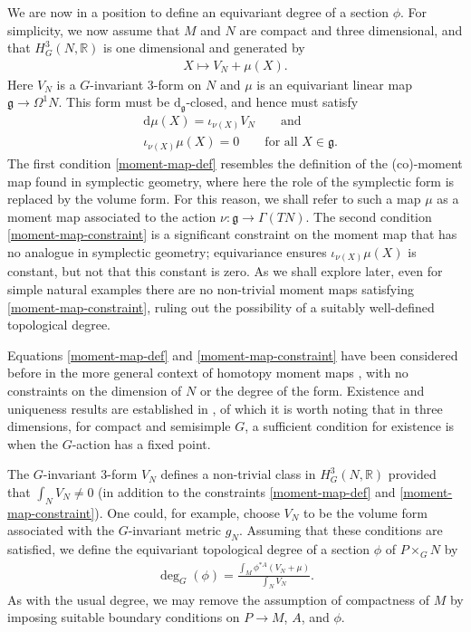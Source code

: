 \documentclass[10pt,a4paper]{amsart}
\newcommand{\g}{{\mathfrak{g}}}
\newcommand{\R}{{\mathbb{R}}}
\newcommand{\1}{{\mathbb{1}}}
\def \d{\mathrm{d}}
\numberwithin{equation}{section}
\begin{document}
We are now in a position to define an equivariant degree of a section $\phi$. For simplicity, we now assume that $M$ and $N$ are compact and three dimensional, and that $H^3_G(N,\R)$ is one dimensional and generated by
\begin{align*}
 X\mapsto V_N+\mu(X).
\end{align*}
Here $V_N$ is a $G$-invariant 3-form on $N$ and $\mu$ is an equivariant linear map $\g\to\Omega^1N$. This form must be $\d_\g$-closed, and hence must satisfy
\begin{align}\label{moment-map-def}
 & \d\mu(X)=\iota_{\nu(X)}V_N\qquad\text{and}\\
\label{moment-map-constraint}
 & \iota_{\nu(X)}\mu(X)=0\qquad\text{for all }X\in\g.
\end{align}
The first condition \eqref{moment-map-def} resembles the definition of the (co)-moment map found in symplectic geometry, where here the role of the symplectic form is replaced by the volume form. For this reason, we shall refer to such a map $\mu$ as a moment map associated to the action $\nu\colon \g\to\Gamma(TN)$.
The second condition \eqref{moment-map-constraint} is a significant constraint on the moment map that has no analogue in symplectic geometry; equivariance ensures $\iota_{\nu(X)}\mu(X)$ is constant, but not that this constant is zero. As we shall explore later, even for simple natural examples there are no non-trivial moment maps satisfying \eqref{moment-map-constraint}, ruling out the possibility of a suitably well-defined topological degree.

Equations \eqref{moment-map-def} and \eqref{moment-map-constraint} have been considered before in the more general context of homotopy moment maps \cite{calliesfregierrogerszambon2016homotopy}, with no constraints on the dimension of $N$ or the degree of the form. Existence and uniqueness results are established in \cite{calliesfregierrogerszambon2016homotopy}, of which it is worth noting that in three dimensions, for compact and semisimple $G$, a sufficient condition for existence is when the $G$-action has a fixed point.

The $G$-invariant 3-form $V_N$ defines a non-trivial class in $H^3_G(N,\R)$ provided that $\int_N V_N\neq0$ (in addition to the constraints \eqref{moment-map-def} and \eqref{moment-map-constraint}). One could, for example, choose $V_N$ to be the volume form associated with the $G$-invariant metric $g_N$. Assuming that these conditions are satisfied, we define the {equivariant topological degree} of a section $\phi$ of $P\times_GN$ by
\begin{align}\label{equivariant-top-degree}
 \deg_G(\phi)=\frac{\int_M\phi^{\ast A}(V_N+\mu)}{\int_N V_N}.
\end{align}
As with the usual degree, we may remove the assumption of compactness of $M$ by imposing suitable boundary conditions on $P\to M$, $A$, and $\phi$.
\end{document}
